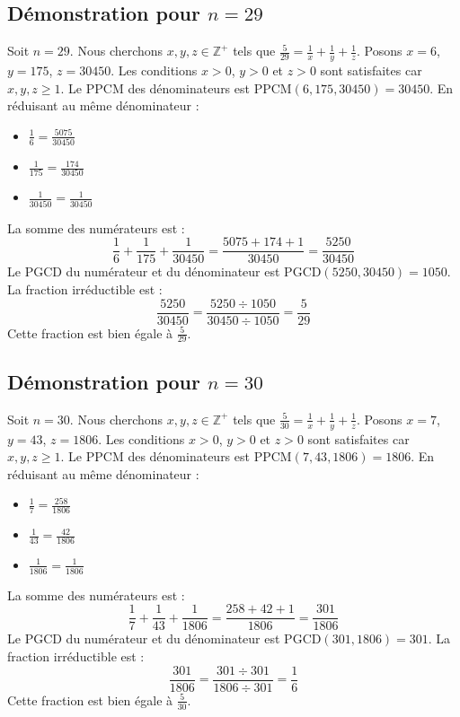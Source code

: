 \documentclass[11pt,a4paper]{article}
\begin{document}
\subsection{Démonstration pour $n = 29$}
Soit $n = 29$. Nous cherchons $x, y, z \in \mathbb{Z}^{+}$ tels que $\frac{5}{29} = \frac{1}{x} + \frac{1}{y} + \frac{1}{z}$.
Posons $x = 6$, $y = 175$, $z = 30450$.
Les conditions $x > 0$, $y > 0$ et $z > 0$ sont satisfaites car $x, y, z \geq 1$.
Le PPCM des dénominateurs est $\text{PPCM}(6, 175, 30450) = 30450$.
En réduisant au même dénominateur :
\begin{itemize}
    \item $\frac{1}{6} = \frac{5075}{30450}$
    \item $\frac{1}{175} = \frac{174}{30450}$
    \item $\frac{1}{30450} = \frac{1}{30450}$
\end{itemize}
La somme des numérateurs est :
$$ \frac{1}{6} + \frac{1}{175} + \frac{1}{30450} = \frac{5075 + 174 + 1}{30450} = \frac{5250}{30450} $$
Le PGCD du numérateur et du dénominateur est $\text{PGCD}(5250, 30450) = 1050$.
La fraction irréductible est :
$$ \frac{5250}{30450} = \frac{5250 \div 1050}{30450 \div 1050} = \frac{5}{29} $$
Cette fraction est bien égale à $\frac{5}{29}$.

\subsection{Démonstration pour $n = 30$}
Soit $n = 30$. Nous cherchons $x, y, z \in \mathbb{Z}^{+}$ tels que $\frac{5}{30} = \frac{1}{x} + \frac{1}{y} + \frac{1}{z}$.
Posons $x = 7$, $y = 43$, $z = 1806$.
Les conditions $x > 0$, $y > 0$ et $z > 0$ sont satisfaites car $x, y, z \geq 1$.
Le PPCM des dénominateurs est $\text{PPCM}(7, 43, 1806) = 1806$.
En réduisant au même dénominateur :
\begin{itemize}
    \item $\frac{1}{7} = \frac{258}{1806}$
    \item $\frac{1}{43} = \frac{42}{1806}$
    \item $\frac{1}{1806} = \frac{1}{1806}$
\end{itemize}
La somme des numérateurs est :
$$ \frac{1}{7} + \frac{1}{43} + \frac{1}{1806} = \frac{258 + 42 + 1}{1806} = \frac{301}{1806} $$
Le PGCD du numérateur et du dénominateur est $\text{PGCD}(301, 1806) = 301$.
La fraction irréductible est :
$$ \frac{301}{1806} = \frac{301 \div 301}{1806 \div 301} = \frac{1}{6} $$
Cette fraction est bien égale à $\frac{5}{30}$.
\end{document}
